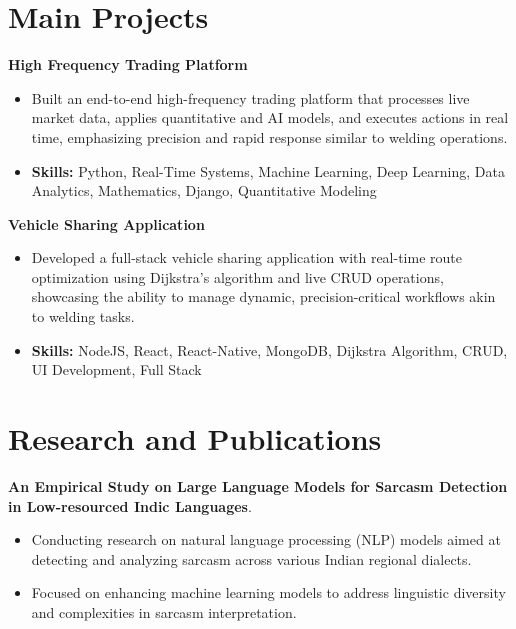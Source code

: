 \documentclass[a4paper,11pt]{article}
\begin{document}
\section{\textbf{Main Projects}}

\vspace{1mm}
  \textbf{High Frequency Trading Platform  }
\vspace{-1.5mm} %
\begin{itemize}
  \item Built an end-to-end high-frequency trading platform that processes live market data, applies quantitative and AI models, and executes actions in real time, emphasizing precision and rapid response similar to welding operations.
\vspace{-3mm}
  \item \textbf{Skills:} Python, Real-Time Systems, Machine Learning, Deep Learning, Data Analytics, Mathematics, Django, Quantitative Modeling
\end{itemize}


\vspace{1mm}
   \textbf{Vehicle Sharing Application }
\vspace{-1.5mm} %
\begin{itemize}
  \item Developed a full-stack vehicle sharing application with real-time route optimization using Dijkstra's algorithm and live CRUD operations, showcasing the ability to manage dynamic, precision-critical workflows akin to welding tasks.
\vspace{-3mm}
  \item \textbf{Skills:} NodeJS, React, React-Native, MongoDB, Dijkstra Algorithm, CRUD, UI Development, Full Stack
\end{itemize}



\section{\textbf{Research and Publications} \hfill }
\vspace{1mm}
  \textbf{An Empirical Study on Large Language Models for Sarcasm Detection in Low-resourced Indic Languages}.
\vspace{-1mm} %
\begin{itemize}
  \item Conducting research on natural language processing (NLP) models aimed at detecting and analyzing sarcasm across various Indian regional dialects.
\vspace{-3mm}
  \item Focused on enhancing machine learning models to address linguistic diversity and complexities in sarcasm interpretation.
\end{itemize}
\end{document}
